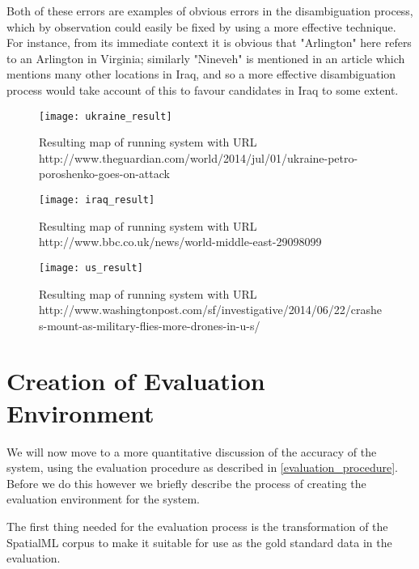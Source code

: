 \documentclass[12pt, a4paper]{report}
\begin{document}
Both of these errors are examples of obvious errors in the disambiguation process, which by observation could easily be fixed by using a more effective technique. For instance, from its immediate context it is obvious that "Arlington" here refers to an Arlington in Virginia; similarly "Nineveh" is mentioned in an article which mentions many other locations in Iraq, and so a more effective disambiguation process would take account of this to favour candidates in Iraq to some extent. 



\begin{figure}[h!]
  \centering
  \texttt{[image: ukraine\_result]}
  \caption{Resulting map of running system with URL http://www.theguardian.com/world/2014/jul/01/ukraine-petro-poroshenko-goes-on-attack}
  \label{fig:ukraine_result}
\end{figure}

\begin{figure}[h!]
  \centering
  \texttt{[image: iraq\_result]}
  \caption{Resulting map of running system with URL http://www.bbc.co.uk/news/world-middle-east-29098099}
  \label{fig:iraq_result}
\end{figure}

\begin{figure}[h!]
  \centering
  \texttt{[image: us\_result]}
  \caption{Resulting map of running system with URL http://www.washingtonpost.com/sf/investigative/2014/06/22/crashes-mount-as-military-flies-more-drones-in-u-s/}
  \label{fig:us_result}
\end{figure}


\section{Creation of Evaluation Environment}
\label{sec:creation_evaluation_environment}

We will now move to a more quantitative discussion of the accuracy of the system, using the evaluation procedure as described in \ref{evaluation_procedure}. Before we do this however we briefly describe the process of creating the evaluation environment for the system.

The first thing needed for the evaluation process is the transformation of the SpatialML corpus to make it suitable for use as the gold standard data in the evaluation.
\end{document}
